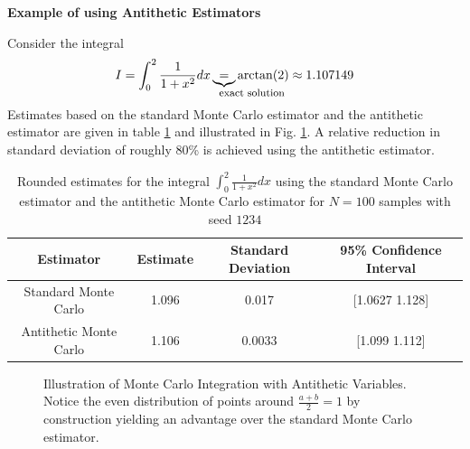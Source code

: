 \textbf{Example of using Antithetic Estimators}
\par
Consider the integral
\begin{equation}
    I = \int_{0}^{2} \frac{1}{1 + x^2} dx \explain{=}{\text{exact solution}} \arctan(2) \approx 1.107149
\end{equation}
Estimates based on the standard Monte Carlo estimator and the antithetic estimator are given in table \ref{tab:antithetic} and illustrated in Fig. \ref{fig:mc_antithetic}. A relative reduction in standard deviation of roughly 80\% is achieved using the antithetic estimator.

\begin{table}[!htb]
    \centering
    \begin{tabular}{|c|c|c|c|}
        \hline
        Estimator & Estimate & Standard Deviation & 95\% Confidence Interval \\
        \hline
        Standard Monte Carlo & 1.096 & 0.017 & [1.0627 1.128] \\
        Antithetic Monte Carlo & 1.106 & 0.0033 & [1.099 1.112] \\
        \hline
    \end{tabular}
    \caption{Rounded estimates for the integral $\int_{0}^{2} \frac{1}{1 + x^2} dx$ using the standard Monte Carlo estimator and the antithetic Monte Carlo estimator for $N = 100$ samples with seed $1234$}
    \label{tab:antithetic}
\end{table}

\begin{figure}[!htb]
    \centering
    \hfill
    \caption{Illustration of Monte Carlo Integration with Antithetic Variables. Notice the even distribution of points around $\frac{a+b}{2} = 1$ by construction yielding an advantage over the standard Monte Carlo estimator.}
    \label{fig:mc_antithetic}
\end{figure}



